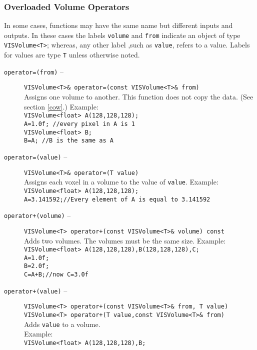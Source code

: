 \subsubsection{Overloaded Volume Operators}
\label{vl_oio}
In some cases, functions may have the same name but different
inputs and outputs.  In these cases the labels {\tt volume} and {\tt from}
indicate an object of type {\tt VISVolume<T>}; whereas, any other label
,such as {\tt value}, refers to a value.  Labels for values
are type {\tt T} unless otherwise noted.
\begin{description}
\item[{\tt operator=(from)} --]
{\tt VISVolume<T>\& operator=(const VISVolume<T>\& from)}\\
Assigns one volume to another.  This function does not copy
the data.  (See section \ref{cow}.)  Example:\\
{\tt VISVolume<float> A(128,128,128);}\\
{\tt A=1.0f; //every pixel in A is 1}\\
{\tt VISVolume<float> B;}\\
{\tt B=A; //B is the same as A}
\item[{\tt operator=(value)} --]
{\tt VISVolume<T>\& operator=(T value)}\\
Assigns each voxel in a volume to the value of {\tt value}.  Example:\\
{\tt VISVolume<float> A(128,128,128);}\\
{\tt A=3.141592;//Every element of A is equal to 3.141592}\\
\item [{\tt operator+(volume)} --]
{\tt VISVolume<T> operator+(const VISVolume<T>\& volume) const}\\
Adds two volumes.  The volumes must be the same size.  Example:\\
{\tt VISVolume<float> A(128,128,128),B(128,128,128),C;}\\
{\tt A=1.0f;}\\
{\tt B=2.0f;}\\
{\tt C=A+B;//now C=3.0f}
\item[{\tt operator+(value)} --]
{\tt VISVolume<T> operator+(const VISVolume<T>\& from, T value)}\\
{\tt VISVolume<T> operator+(T value,const VISVolume<T>\& from)}\\
Adds {\tt value} to a volume.\\
Example:\\
{\tt VISVolume<float> A(128,128,128),B;}\\

\end{description}
